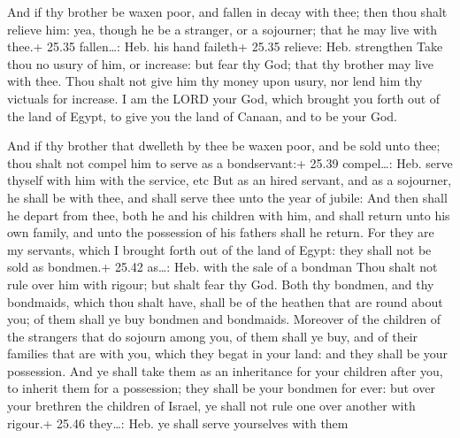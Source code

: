  And if thy brother be waxen poor, and fallen in decay
with thee; then thou shalt relieve him: yea, though he be a stranger, or
a sojourner; that he may live with thee.+ 25.35 fallen\ldots: Heb. his
hand faileth+ 25.35 relieve: Heb. strengthen  Take thou no
usury of him, or increase: but fear thy God; that thy brother may live
with thee.  Thou shalt not give him thy money upon usury,
nor lend him thy victuals for increase.  I am the LORD your
God, which brought you forth out of the land of Egypt, to give you the
land of Canaan, and to be your God.

 And if thy brother that dwelleth by thee be waxen poor,
and be sold unto thee; thou shalt not compel him to serve as a
bondservant:+ 25.39 compel\ldots: Heb. serve thyself with him with the
service, etc  But as an hired servant, and as a sojourner,
he shall be with thee, and shall serve thee unto the year of jubile:
 And then shall he depart from thee, both he and his
children with him, and shall return unto his own family, and unto the
possession of his fathers shall he return.  For they are my
servants, which I brought forth out of the land of Egypt: they shall not
be sold as bondmen.+ 25.42 as\ldots: Heb. with the sale of a bondman
 Thou shalt not rule over him with rigour; but shalt fear
thy God.  Both thy bondmen, and thy bondmaids, which thou
shalt have, shall be of the heathen that are round about you; of them
shall ye buy bondmen and bondmaids.  Moreover of the
children of the strangers that do sojourn among you, of them shall ye
buy, and of their families that are with you, which they begat in your
land: and they shall be your possession.  And ye shall take
them as an inheritance for your children after you, to inherit them for
a possession; they shall be your bondmen for ever: but over your
brethren the children of Israel, ye shall not rule one over another with
rigour.+ 25.46 they\ldots: Heb. ye shall serve yourselves with them

